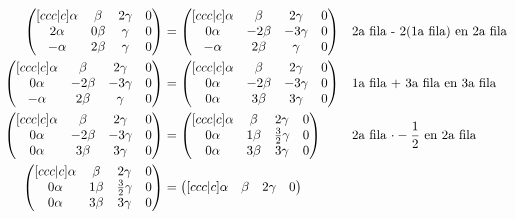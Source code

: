 \documentclass[letterpaper]{article}
\renewcommand{\*}{\cdot}
\theoremstyle{definition}
\begin{document}
		\begin{align*}
		\begin{pmatrix}[ccc|c]
		\alpha & \beta & 2\gamma & 0\\
		2\alpha & 0\beta & \gamma & 0 \\
		-\alpha & 2\beta & \gamma & 0 
		\end{pmatrix} & = \begin{pmatrix}[ccc|c]
		\alpha & \beta & 2\gamma & 0\\
		0\alpha & -2\beta & -3\gamma & 0\\
		-\alpha & 2\beta & \gamma & 0
		\end{pmatrix} && \text{2a fila - 2(1a fila) en 2a fila}\\
		\begin{pmatrix}[ccc|c]
		\alpha & \beta & 2\gamma & 0\\
		0\alpha & -2\beta & -3\gamma & 0\\
		-\alpha & 2\beta & \gamma & 0 
		\end{pmatrix} & = \begin{pmatrix}[ccc|c]
		\alpha & \beta & 2\gamma & 0\\
		0\alpha & -2\beta & -3\gamma & 0\\
		0\alpha & 3\beta & 3\gamma & 0
		\end{pmatrix} && \text{1a fila + 3a fila en 3a fila}\\
		\begin{pmatrix}[ccc|c]
		\alpha & \beta & 2\gamma & 0\\
		0\alpha & -2\beta & -3\gamma & 0\\
		0\alpha & 3\beta & 3\gamma & 0
		\end{pmatrix}  & = \begin{pmatrix}[ccc|c]
		\alpha & \beta & 2\gamma & 0\\
		0\alpha & 1\beta & \frac{3}{2}\gamma & 0\\
		0\alpha & 3\beta & 3\gamma & 0
		\end{pmatrix}  && \text{2a fila $ \* -\frac{1}{2} $ en 2a fila}\\
			 \begin{pmatrix}[ccc|c]
			 \alpha & \beta & 2\gamma & 0\\
			 0\alpha & 1\beta & \frac{3}{2}\gamma & 0\\
			 0\alpha & 3\beta & 3\gamma & 0
			 \end{pmatrix} & =\begin{pmatrix}[ccc|c]
			 \alpha & \beta & 2\gamma & 0\\

\end{pmatrix}
\end{align*}
\end{document}

